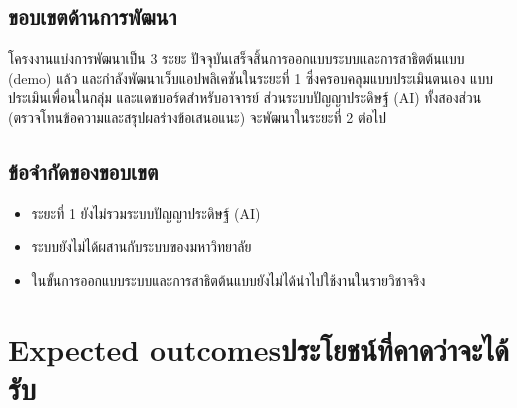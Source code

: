 \subsection{ขอบเขตด้านการพัฒนา}

โครงงานแบ่งการพัฒนาเป็น 3 ระยะ ปัจจุบันเสร็จสิ้นการออกแบบระบบและการสาธิตต้นแบบ (demo) แล้ว และกำลังพัฒนาเว็บแอปพลิเคชันในระยะที่ 1 ซึ่งครอบคลุมแบบประเมินตนเอง แบบประเมินเพื่อนในกลุ่ม และแดชบอร์ดสำหรับอาจารย์ ส่วนระบบปัญญาประดิษฐ์ (AI) ทั้งสองส่วน (ตรวจโทนข้อความและสรุปผลร่างข้อเสนอแนะ) จะพัฒนาในระยะที่ 2 ต่อไป

\subsection{ข้อจำกัดของขอบเขต}

\begin{itemize}
  \item ระยะที่ 1 ยังไม่รวมระบบปัญญาประดิษฐ์ (AI)
  \item ระบบยังไม่ได้ผสานกับระบบของมหาวิทยาลัย
  \item ในขั้นการออกแบบระบบและการสาธิตต้นแบบยังไม่ได้นำไปใช้งานในรายวิชาจริง
\end{itemize}

\section{\ifenglish Expected outcomes\else ประโยชน์ที่คาดว่าจะได้รับ\fi}

